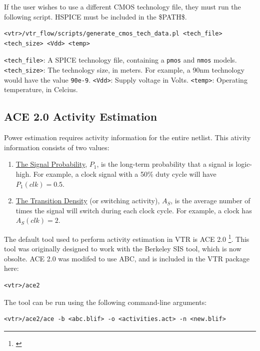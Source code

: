 \documentclass[letterpaper,twoside,10pt]{article}
\begin{document}
If the user wishes to use a different CMOS technology file, they must run the following script.  HSPICE must be included in the \$PATH\$.

\begin{BVerbatim}[bgcolor=LightGray, boxwidth=\textwidth] 
<vtr>/vtr_flow/scripts/generate_cmos_tech_data.pl <tech_file> <tech_size> <Vdd> <temp>
\end{BVerbatim}

\texttt{<tech\_file>}: A SPICE technology file, containing a \texttt{pmos} and \texttt{nmos} models. \newline
\texttt{<tech\_size>}: The technology size, in meters. For example, a 90nm technology would have the value \texttt{90e-9}. \newline
\texttt{<Vdd>}: Supply voltage in Volts. \newline
\texttt{<temp>}: Operating temperature, in Celcius. 

\subsection{ACE 2.0 Activity Estimation} \label{sec:ace}
Power estimation requires activity information for the entire netlist.  This ativity information consists of two values:
\vspace{-10pt}
\begin{enumerate}
	\item  \underline{The Signal Probability}, $P_1$, is the long-term probability that a signal is logic-high.  For example, a clock signal with a 50\% duty cycle will have $P_1(clk) = 0.5$.
	\item \underline{The Transition Density} (or switching activity), $A_S$, is the average number of times the signal will switch during each clock cycle.  For example, a clock has $A_S(clk)=2$.
\end{enumerate}

The default tool used to perform activity estimation in VTR is ACE 2.0 \footnote{\cite{ace2}}.  
This tool was originally designed to work with the Berkeley SIS tool, which is now obsolte.  ACE 2.0 was modifed to use ABC, and is included in the VTR package here:

\begin{BVerbatim}[bgcolor=LightGray, boxwidth=\textwidth] 
<vtr>/ace2
\end{BVerbatim}

The tool can be run using the following command-line arguments:

\begin{BVerbatim}[bgcolor=LightGray, boxwidth=\textwidth] 
<vtr>/ace2/ace -b <abc.blif> -o <activities.act> -n <new.blif>
\end{BVerbatim}
\end{document}

